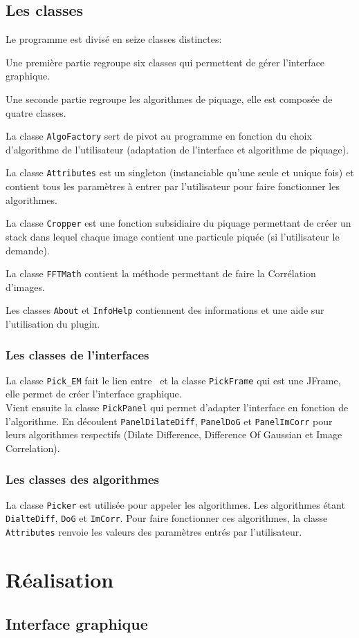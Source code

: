 \documentclass[11pt,a4paper]{report}
\begin{document}
\section{Les classes}
Le programme est divisé en seize classes distinctes: 
\begin{list}{•}
\item Une première partie regroupe six classes qui permettent de gérer l'interface graphique. 
\item 
\item Une seconde partie regroupe les algorithmes de piquage, elle est composée de quatre classes.
\item La classe \texttt{AlgoFactory} sert de pivot au programme en fonction du choix d'algorithme de l'utilisateur (adaptation de l'interface et algorithme de piquage).
\item La classe \texttt{Attributes} est un singleton (instanciable qu'une seule et unique fois) et contient tous les paramètres à entrer par l'utilisateur pour faire fonctionner les algorithmes.
\item La classe \texttt{Cropper} est une fonction subsidiaire du piquage permettant de créer un stack dans lequel chaque image contient une particule piquée (si l'utilisateur le demande).
\item La classe \texttt{FFTMath} contient la méthode permettant de faire la Corrélation d'images. 
\item Les classes \texttt{About} et \texttt{InfoHelp} contiennent des informations et une aide sur l'utilisation du plugin.
\end{list}

\subsection{Les classes de l'interfaces}
La classe \texttt{Pick\_EM} fait le lien entre \imj ~et la classe \texttt{PickFrame} qui est une JFrame, elle permet de créer l'interface graphique.\\
Vient ensuite la classe \texttt{PickPanel} qui permet d'adapter l'interface en fonction de l'algorithme. En découlent \texttt{PanelDilateDiff}, \texttt{PanelDoG} et \texttt{PanelImCorr} pour leurs algorithmes respectifs (Dilate Difference, Difference Of Gaussian et Image Correlation).

\subsection{Les classes des algorithmes}
La classe \texttt{Picker} est utilisée pour appeler les algorithmes. Les algorithmes étant \texttt{DialteDiff}, \texttt{DoG} et \texttt{ImCorr}.
Pour faire fonctionner ces algorithmes, la classe \texttt{Attributes} renvoie les valeurs des paramètres entrés par l'utilisateur. 

\chapter{Réalisation}

\section{Interface graphique}
\end{document}
